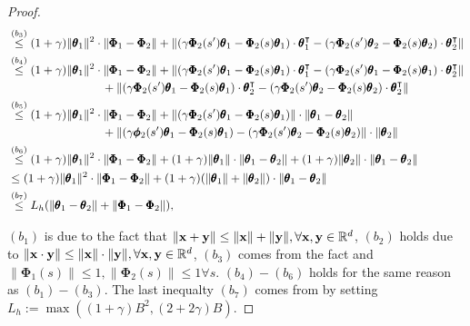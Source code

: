 \documentclass{article} %
\theoremstyle{plain}
\theoremstyle{definition}
\theoremstyle{remark}
\begin{document}
{\begin{proof}
\begin{align*}
   &\overset{(b_3)}{\leq} (1+\gamma)\|\pmb{\theta}_1\|^2\cdot\|\pmb{\Phi}_1-\pmb{\Phi}_2\|+\|(\gamma \pmb{\Phi}_2(s^\prime) \pmb{\theta}_1-\pmb{\Phi}_2(s)\pmb{\theta}_1)\cdot\pmb{\theta}_1^\intercal-(\gamma \pmb{\Phi}_2(s^\prime) \pmb{\theta}_2-\pmb{\Phi}_2(s)\pmb{\theta}_2)\cdot\pmb{\theta}_2^\intercal\|\allowdisplaybreaks\\
   &\overset{(b_4)}{\leq} (1+\gamma)\|\pmb{\theta}_1\|^2\cdot\|\pmb{\Phi}_1-\pmb{\Phi}_2\|+\|(\gamma \pmb{\Phi}_2(s^\prime) \pmb{\theta}_1-\pmb{\Phi}_2(s)\pmb{\theta}_1)\cdot\pmb{\theta}_1^\intercal-(\gamma \pmb{\Phi}_2(s^\prime) \pmb{\theta}_1-\pmb{\Phi}_2(s)\pmb{\theta}_1)\cdot\pmb{\theta}_2^\intercal\|\allowdisplaybreaks\\
   &\qquad\qquad\qquad\qquad+\|(\gamma \pmb{\Phi}_2(s^\prime) \pmb{\theta}_1-\pmb{\Phi}_2(s)\pmb{\theta}_1)\cdot\pmb{\theta}_2^\intercal-(\gamma \pmb{\Phi}_2(s^\prime) \pmb{\theta}_2-\pmb{\Phi}_2(s)\pmb{\theta}_2)\cdot\pmb{\theta}_2^\intercal\|\allowdisplaybreaks\\
   &\overset{(b_5)}{\leq} (1+\gamma)\|\pmb{\theta}_1\|^2\cdot\|\pmb{\Phi}_1-\pmb{\Phi}_2\|+\|(\gamma \pmb{\Phi}_2(s^\prime) \pmb{\theta}_1-\pmb{\Phi}_2(s)\pmb{\theta}_1)\|\cdot\|\pmb{\theta}_1-\pmb{\theta}_2\|\allowdisplaybreaks\\
   &\qquad\qquad\qquad\qquad+\|(\gamma \pmb{\phi}_2(s^\prime) \pmb{\theta}_1-\pmb{\Phi}_2(s)\pmb{\theta}_1)-(\gamma \pmb{\Phi}_2(s^\prime) \pmb{\theta}_2-\pmb{\Phi}_2(s)\pmb{\theta}_2)\|\cdot\|\pmb{\theta}_2\|\allowdisplaybreaks\\
   &\overset{(b_6)}{\leq} (1+\gamma)\|\pmb{\theta}_1\|^2\cdot\|\pmb{\Phi}_1-\pmb{\Phi}_2\|+(1+\gamma)\|\pmb{\theta}_1\|\cdot\|\pmb{\theta}_1-\pmb{\theta}_2\|+(1+\gamma)\| \pmb{\theta}_2\|\cdot\|\pmb{\theta}_1-\pmb{\theta}_2\|\allowdisplaybreaks\\
   &\leq (1+\gamma)\|\pmb{\theta}_1\|^2\cdot\|\pmb{\Phi}_1-\pmb{\Phi}_2\|+(1+\gamma)(\|\pmb{\theta}_1\|+\|\pmb{\theta}_2\|)\cdot\|\pmb{\theta}_1-\pmb{\theta}_2\|\allowdisplaybreaks\\
   &\overset{(b_7)}{\leq} L_h(\|\pmb{\theta}_1-\pmb{\theta}_2\|+\|\pmb{\Phi}_1-\pmb{\Phi}_2\|),
\end{align*}

$(b_1)$ is due to the fact that $\|{\mathbf{x}}+{\mathbf{y}}\|\leq \|{\mathbf{x}}\|+\|{\mathbf{y}}\|, \forall {\mathbf{x}},{\mathbf{y}}\in\mathbb{R}^{d}$, $(b_2)$ holds due to $\|{\mathbf{x}}\cdot{\mathbf{y}}\|\leq \|{\mathbf{x}}\|\cdot\|{\mathbf{y}}\|, \forall {\mathbf{x}},{\mathbf{y}}\in\mathbb{R}^{d}$, $(b_3)$ comes from the fact and $\|\pmb{\Phi}_1(s)\|\leq 1, \|\pmb{\Phi}_2(s)\|\leq 1 \forall s.$ 
$(b_4)-(b_6)$ holds for the same reason as $(b_1)-(b_3)$. The last inequalty $(b_7)$ comes from by setting $L_h:=\max((1+\gamma)B^2, (2+2\gamma)B)$.
\end{proof}

}
\end{document}
